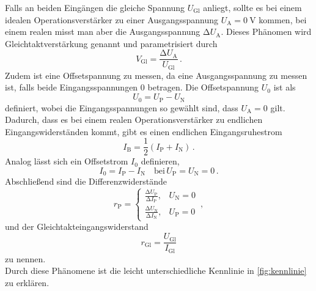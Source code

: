         \noindent 
        Falls an beiden Eingängen die gleiche Spannung $U_\text{Gl}$ anliegt, sollte es bei einem idealen Operationsverstärker zu einer Ausgangsspannung $U_\text{A} = \SI{0}{\volt}$ 
        kommen, bei einem realen misst man aber die Ausgangsspannung $\increment U_\text{A}$. 
        Dieses Phänomen wird Gleichtaktverstärkung genannt und parametrisiert durch 
        \begin{equation*}
            V_\text{Gl} = \frac{\increment U_\text{A}}{U_\text{Gl}}\, .
        \end{equation*}
        Zudem ist eine Offsetspannung zu messen, da eine Ausgangsspannung zu messen ist, falls beide Eingangsspannungen $0$ betragen. Die Offsetspannung $U_0$ ist als 
        \begin{equation*}
            U_0 = U_\text{P} - U_\text{N}
        \end{equation*}
        definiert, 
        wobei die Eingangsspannungen so gewählt sind, dass $U_\text{A}=0$ gilt. \\
        Dadurch, dass es bei einem realen Operationsverstärker zu endlichen Eingangswiderständen kommt, gibt es einen endlichen Eingangsruhestrom 
        \begin{equation*}
            I_\text{B} = \frac{1}{2}\left( I_\text{P} + I_\text{N}\right)\, .
        \end{equation*}
        Analog lässt sich ein Offsetstrom $I_0$ definieren, 
        \begin{equation*}
            I_0 = I_\text{P} - I_\text{N}\quad \text{bei}\, U_\text{P} = U_\text{N}=0\, .
        \end{equation*}
        Abschließend sind die Differenzwiderstände
        \begin{equation*}
            r_\text{P} = \begin{cases}
                \frac{\increment U_\text{P}}{\increment I_\text{P}} , & U_\text{N}=0\\
                \frac{\increment U_\text{N}}{\increment I_\text{N}} , & U_\text{P}=0
            \end{cases}\, ,
        \end{equation*}
        und der Gleichtakteingangswiderstand 
        \begin{equation*}
            r_\text{Gl} = \frac{U_\text{Gl}}{I_\text{Gl}}
        \end{equation*}
        zu nennen. \\
        Durch diese Phänomene ist die leicht unterschiedliche Kennlinie in \autoref{fig:kennlinie} zu erklären. 

